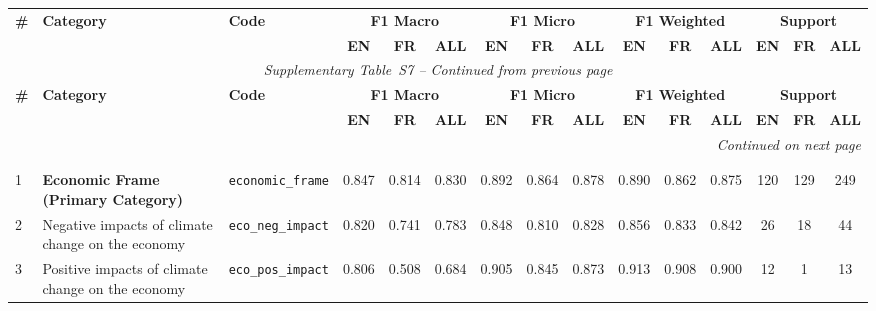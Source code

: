 \label{tab:test_metrics_s7}
\begin{longtable}{p{0.4cm}p{4.0cm}p{3.0cm}cccccccccccc}
\toprule
\multirow{2}{*}{\textbf{\#}} & \multirow{2}{*}{\textbf{Category}} & \multirow{2}{*}{\textbf{Code}} & \multicolumn{3}{c}{\textbf{F1 Macro}} & \multicolumn{3}{c}{\textbf{F1 Micro}} & \multicolumn{3}{c}{\textbf{F1 Weighted}} & \multicolumn{3}{c}{\textbf{Support}} \\
\cmidrule(lr){4-6} \cmidrule(lr){7-9} \cmidrule(lr){10-12} \cmidrule(lr){13-15}
& & & \textbf{EN} & \textbf{FR} & \textbf{ALL} & \textbf{EN} & \textbf{FR} & \textbf{ALL} & \textbf{EN} & \textbf{FR} & \textbf{ALL} & \textbf{EN} & \textbf{FR} & \textbf{ALL} \\
\midrule
\endfirsthead
\multicolumn{15}{c}{\textit{Supplementary Table~S7 -- Continued from previous page}} \\
\toprule
\multirow{2}{*}{\textbf{\#}} & \multirow{2}{*}{\textbf{Category}} & \multirow{2}{*}{\textbf{Code}} & \multicolumn{3}{c}{\textbf{F1 Macro}} & \multicolumn{3}{c}{\textbf{F1 Micro}} & \multicolumn{3}{c}{\textbf{F1 Weighted}} & \multicolumn{3}{c}{\textbf{Support}} \\
\cmidrule(lr){4-6} \cmidrule(lr){7-9} \cmidrule(lr){10-12} \cmidrule(lr){13-15}
& & & \textbf{EN} & \textbf{FR} & \textbf{ALL} & \textbf{EN} & \textbf{FR} & \textbf{ALL} & \textbf{EN} & \textbf{FR} & \textbf{ALL} & \textbf{EN} & \textbf{FR} & \textbf{ALL} \\
\midrule
\endhead
\midrule
\multicolumn{15}{r}{\textit{Continued on next page}} \\
\endfoot
\bottomrule
\endlastfoot
\multicolumn{15}{l}{\cellcolor{gray!10}\textbf{MAIN FRAMES}} \\
\midrule
\rowcolor{gray!8}
\multicolumn{15}{l}{\textit{Economic Frame}} \\
\midrule
1 & \textbf{Economic Frame\newline (Primary Category)} & \texttt{economic\_frame} & 0.847 & 0.814 & 0.830 & 0.892 & 0.864 & 0.878 & 0.890 & 0.862 & 0.875 & 120 & 129 & 249 \\
\cmidrule(lr){1-15}
2 & Negative impacts of climate change on the economy & \texttt{eco\_neg\_impact} & 0.820 & 0.741 & 0.783 & 0.848 & 0.810 & 0.828 & 0.856 & 0.833 & 0.842 & 26 & 18 & 44 \\
3 & Positive impacts of climate change on the economy & \texttt{eco\_pos\_impact} & 0.806 & 0.508 & 0.684 & 0.905 & 0.845 & 0.873 & 0.913 & 0.908 & 0.900 & 12 & 1 & 13 \\

\end{longtable}
